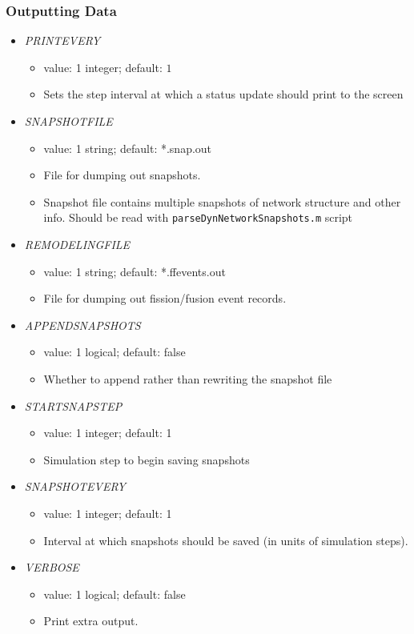 \documentclass[12pt]{article}
\begin{document}
\subsubsection*{Outputting Data}
\begin{itemize}
%
\item {\it PRINTEVERY}
  \begin{itemize}
    \item  value: 1 integer; default: $1$
    \item Sets the step interval at which a status update should print to the screen
  \end{itemize}
%
\item {\it SNAPSHOTFILE}
  \begin{itemize}
    \item  value: 1 string; default: *.snap.out
    \item File for dumping out snapshots. 
    \item Snapshot file contains multiple snapshots of network structure and other info. Should be read with \verb=parseDynNetworkSnapshots.m= script
  \end{itemize}
%
\item {\it REMODELINGFILE}
  \begin{itemize}
    \item  value: 1 string; default: *.ffevents.out
    \item File for dumping out fission/fusion event records.
  \end{itemize}
%
\item {\it APPENDSNAPSHOTS}
  \begin{itemize}
    \item value: 1 logical; default: false
    \item Whether to append rather than rewriting the snapshot file
  \end{itemize}
%
\item {\it STARTSNAPSTEP}
  \begin{itemize}
    \item  value: 1 integer; default: 1
    \item Simulation step to begin saving snapshots
  \end{itemize}
%
\item {\it SNAPSHOTEVERY}
  \begin{itemize}
    \item  value: 1 integer; default: 1
    \item Interval at which snapshots should be saved (in units of simulation steps).
  \end{itemize}

%
\item {\it VERBOSE}
  \begin{itemize}
    \item  value: 1 logical; default: false
    \item Print extra output.
  \end{itemize}
\end{itemize}
\end{document}

